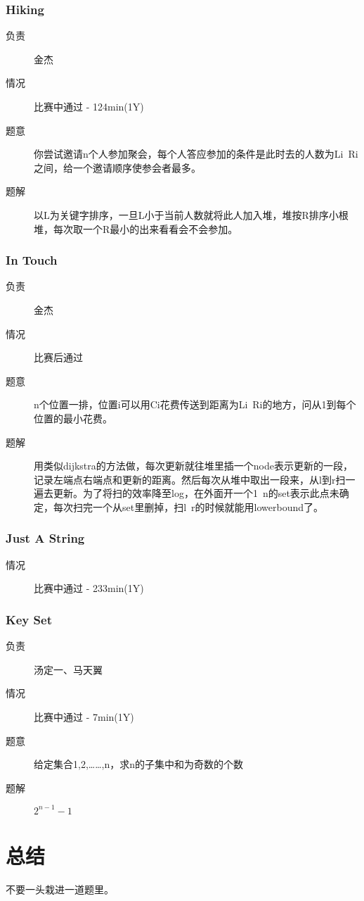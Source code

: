 \documentclass[a4paper, 11pt, nofonts, nocap, fancyhdr]{ctexart}
\newcommand{\problem}[1]{\subsubsection{#1}}
\begin{document}
\problem{Hiking}

\begin{description}
\item[负责] 金杰
\item[情况] 比赛中通过 - 124min(1Y)
\item[题意]
你尝试邀请n个人参加聚会，每个人答应参加的条件是此时去的人数为Li~Ri之间，给一个邀请顺序使参会者最多。
\item[题解]
以L为关键字排序，一旦L小于当前人数就将此人加入堆，堆按R排序小根堆，每次取一个R最小的出来看看会不会参加。
\end{description}

\problem{In Touch}

\begin{description}
\item[负责] 金杰
\item[情况] 比赛后通过
\item[题意]
n个位置一排，位置i可以用Ci花费传送到距离为Li~Ri的地方，问从1到每个位置的最小花费。
\item[题解]
用类似dijkstra的方法做，每次更新就往堆里插一个node表示更新的一段，记录左端点右端点和更新的距离。然后每次从堆中取出一段来，从l到r扫一遍去更新。为了将扫的效率降至log，在外面开一个1~n的set表示此点未确定，每次扫完一个从set里删掉，扫l~r的时候就能用lowerbound了。
\end{description}

\problem{Just A String}

\begin{description}
\item[情况] 比赛中通过 - 233min(1Y)
\end{description}

\problem{Key Set}

\begin{description}
\item[负责]汤定一、马天翼
\item[情况] 比赛中通过 - 7min(1Y)
\item[题意]
给定集合{1,2,……,n}，求n的子集中和为奇数的个数
\item[题解]
$2^{n-1}-1$
\end{description}

\section{总结}

不要一头栽进一道题里。
\end{document}
